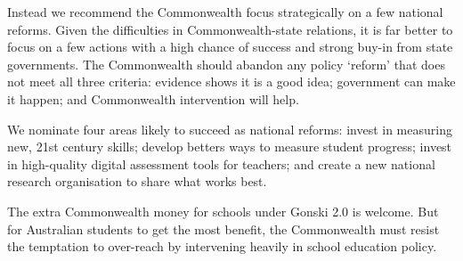 \begin{overview}
Instead we recommend the Commonwealth focus strategically on a few national reforms. Given the difficulties in Commonwealth-state relations, it is far better to focus on a few actions with a high chance of success and strong buy-in from state governments. The Commonwealth should abandon any policy `reform' that does not meet all three criteria: evidence shows it is a good idea; government can make it happen; and Commonwealth intervention will help. 

We nominate four areas likely to succeed as national reforms: invest in measuring new, 21st century skills; develop betters ways to measure student progress; invest in high-quality digital assessment tools for teachers; and create a new national research organisation to share what works best.

The extra Commonwealth money for schools under Gonski 2.0 is welcome. But for Australian students to get the most benefit, the Commonwealth must resist the temptation to over-reach by intervening heavily in school education policy.

\end{overview}
